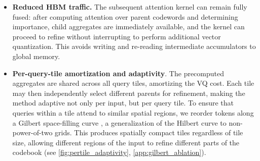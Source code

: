 \begin{itemize}
\item \textbf{Reduced HBM traffic.} The subsequent attention kernel can remain fully fused: after computing attention over parent codewords and determining importance, child aggregates are immediately available, and the kernel can proceed to refine without interrupting to perform additional vector quantization. This avoids writing and re-reading intermediate accumulators to global memory.
\item \textbf{Per-query-tile amortization and adaptivity}. The precomputed aggregates are shared across all query tiles, amortizing the VQ cost. Each tile may then independently select different parents for refinement, making the method adaptive not only per input, but per query tile. To ensure that queries within a tile attend to similar spatial regions, we reorder tokens along a Gilbert space-filling curve \cite{cerveny2018gilbert}, a generalization of the Hilbert curve to non-power-of-two grids. This produces spatially compact tiles regardless of tile size, allowing different regions of the input to refine different parts of the codebook (see \cref{fig:pertile_adaptivity}, \cref{app:gilbert_ablation}).
\end{itemize}
\newpage
\renewcommand{\algorithmicrequire}{\textbf{Input:}}
\renewcommand{\algorithmicensure}{\textbf{Output:}}
